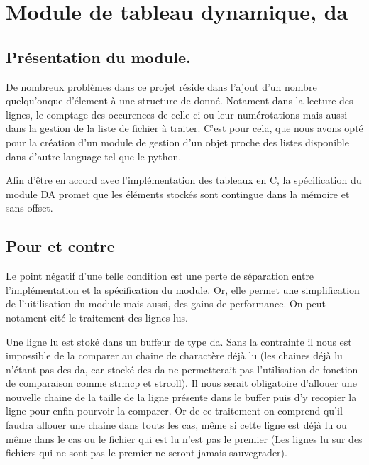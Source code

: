 \documentclass[12pt]{article}
\begin{document}
    \newpage

    \section{Module de tableau dynamique, da}

    \subsection{Présentation du module.}

    De nombreux problèmes dans ce projet réside dans l'ajout d'un nombre 
    quelqu'onque d'élement à une structure de donné. Notament dans la 
    lecture des lignes, le comptage des occurences de celle-ci ou leur 
    numérotations mais aussi dans la gestion de la liste de fichier à 
    traiter. C'est pour cela, que nous avons opté pour la création d'un 
    module de gestion d'un objet proche des listes disponible dans d'autre 
    language tel que le python. 

    Afin d'être en accord avec l'implémentation des tableaux en C, la 
    spécification du module DA promet que les éléments stockés sont 
    contingue dans la mémoire et sans offset.
    
    \subsection{Pour et contre}

    Le point négatif d'une telle condition est une perte de séparation 
    entre l'implémentation et la spécification du module. Or, elle permet 
    une simplification de l'uitilisation du module mais aussi, des gains de 
    performance. On peut notament cité le traitement des lignes lus. 

    Une ligne lu est stoké dans un buffeur de type da. Sans la contrainte il
    nous est impossible de la comparer au chaine de charactère déjà lu 
    (les chaines déjà lu n'étant pas des da, car stocké des da ne 
    permetterait pas l'utilisation de fonction de comparaison comme strmcp 
    et strcoll). Il nous serait obligatoire d'allouer une nouvelle chaine 
    de la taille de la ligne présente dans le buffer puis d'y recopier la 
    ligne pour enfin pourvoir la comparer. Or de ce traitement on comprend 
    qu'il faudra allouer une chaine dans touts les cas, même si cette ligne
    est déjà lu ou même dans le cas ou le fichier qui est lu n'est pas le 
    premier (Les lignes lu sur des fichiers qui ne sont pas le premier ne 
    seront jamais sauvegrader). 
    
\end{document}
